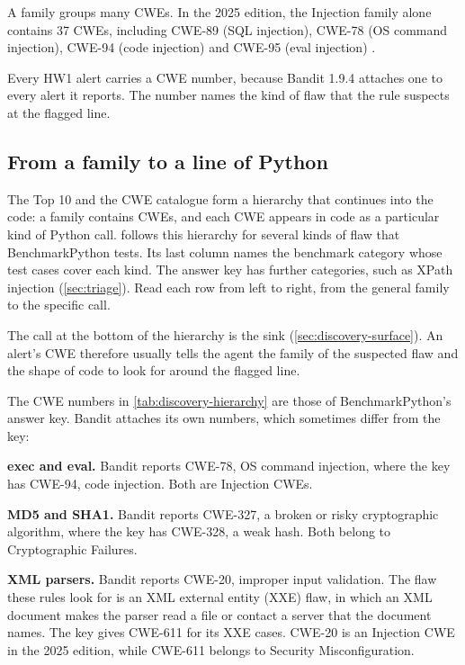 A family groups many CWEs. In the 2025 edition, the Injection family alone contains 37 CWEs,
including CWE-89 (SQL injection), CWE-78 (OS command injection), CWE-94 (code injection) and
CWE-95 (eval injection) \citep{owasp2025top10}.

Every HW1 alert carries a CWE number, because Bandit 1.9.4 attaches one to every alert it reports.
The number names the kind of flaw that the rule suspects at the flagged line.

\subsection{From a family to a line of Python}
\label{sec:discovery-python}

The Top 10 and the CWE catalogue form a hierarchy that continues into the code: a family contains
CWEs, and each CWE appears in code as a particular kind of Python call.
 follows this hierarchy for several kinds of flaw that
BenchmarkPython tests. Its last column names the benchmark category whose test cases cover each
kind. The answer key has further categories, such as XPath injection (\cref{sec:triage}). Read each
row from left to right, from the general family to the specific call.

The call at the bottom of the hierarchy is the sink (\cref{sec:discovery-surface}). An alert's CWE
therefore usually tells the agent the family of the suspected flaw and the shape of code to look
for around the flagged line.

The CWE numbers in \cref{tab:discovery-hierarchy} are those of BenchmarkPython's answer key. Bandit
attaches its own numbers, which sometimes differ from the key:
\bi
\item \textbf{exec and eval.} Bandit reports CWE-78, OS command injection, where the key has CWE-94,
code injection. Both are Injection CWEs.
\item \textbf{MD5 and SHA1.} Bandit reports CWE-327, a broken or risky cryptographic algorithm, where
the key has CWE-328, a weak hash. Both belong to Cryptographic Failures.
\item \textbf{XML parsers.} Bandit reports CWE-20, improper input validation. The flaw these rules
look for is an XML external entity (XXE) flaw, in which an XML document makes the parser read a file
or contact a server that the document names. The key gives CWE-611 for its XXE cases. CWE-20 is an
Injection CWE in the 2025 edition, while CWE-611 belongs to Security Misconfiguration.
\ei

